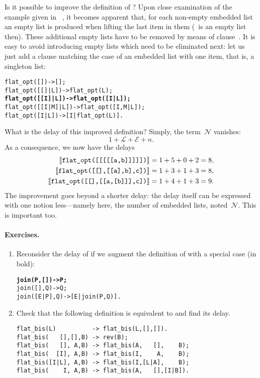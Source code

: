 Is it possible to improve the definition of ?  Upon
close examination of the example given in
\figs~, it becomes apparent
that, for each non\hyp{}empty embedded list an empty list is produced
when lifting the last item in them (~is an empty list
then). These additional empty lists have to be removed by means of
clause~\clause{\beta}. It is easy to avoid introducing empty lists
which need to be eliminated next: let us just add a clause matching
the case of an embedded list with one item, that is, a singleton
list:\label{code:flat_opt}
\begin{alltt}
flat_opt(       []) -> [];
flat_opt(   [[]|L]) -> flat_opt(L);
\textbf{flat\_opt(  [[I]|L]) -> flat_opt([I|L]);}\hfill% \emph{Improvement}
flat_opt([[I|M]|L]) -> flat_opt([I,M|L]);\hfill% M \(\neq\) []
flat_opt(    [I|L]) -> [I|flat_opt(L)].
\end{alltt}
What is the delay of this improved definition? Simply, the
term~\(\mathcal{N}\) vanishes:
\[
1 + \mathcal{L} + \mathcal{E} + n.
\]
As a consequence, we now have the delays
\begin{align*}
\llbracket{\texttt{flat\_opt([[[[[a,b]]]]])}}\rrbracket    &= 1 + 5 + 0 + 2 = 8,\\
\llbracket{\texttt{flat\_opt([[],[[a],b],c])}}\rrbracket   &= 1 + 3 + 1 + 3 = 8,\\
\llbracket{\texttt{flat\_opt([[],[[a,[b]]],c])}}\rrbracket &= 1 + 4 + 1 + 3 = 9.
\end{align*}
The improvement goes beyond a shorter delay: the delay itself can be
expressed with one notion less---namely here, the number of embedded
lists, noted~\(\mathcal{N}\). This is important too.

\medskip

\paragraph{Exercises.}

\begin{enumerate}

  \item Reconsider the delay of  if we augment the
    definition of  with a special case (in bold):
\begin{alltt}
\textbf{join(    P,[]) -> P;}
join(   [], Q) -> Q;
join([E|P], Q) -> [E|join(P,Q)].
\end{alltt}

  \item Check that the following definition is equivalent
    to  and find its delay.
\begin{verbatim}
flat_bis(L)          -> flat_bis(L,[],[]).
flat_bis(   [],[],B) -> rev(B);
flat_bis(   [], A,B) -> flat_bis(A,   [],    B);
flat_bis(  [I], A,B) -> flat_bis(I,    A,    B);
flat_bis([I|L], A,B) -> flat_bis(I,[L|A],    B);
flat_bis(    I, A,B) -> flat_bis(A,   [],[I|B]).
\end{verbatim}

\end{enumerate}
